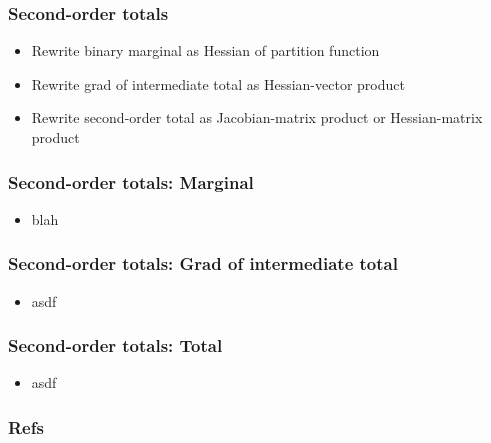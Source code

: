 \documentclass{beamer}
\begin{document}
\begin{frame}
\frametitle{Second-order totals}
\begin{itemize}
\item Rewrite binary marginal as Hessian of partition function
\item Rewrite grad of intermediate total as Hessian-vector product
\item Rewrite second-order total as Jacobian-matrix product or Hessian-matrix product
\end{itemize}
\end{frame}


\begin{frame}
\frametitle{Second-order totals: Marginal}
\begin{itemize}
\item blah
\end{itemize}
\end{frame}

\begin{frame}
\frametitle{Second-order totals: Grad of intermediate total}
\begin{itemize}
    \item asdf
\end{itemize}
\end{frame}

\begin{frame}
\frametitle{Second-order totals: Total}
\begin{itemize}
    \item asdf
\end{itemize}
\end{frame}

\begin{frame}[allowframebreaks]
\frametitle{Refs}

\end{frame}
\end{document}
